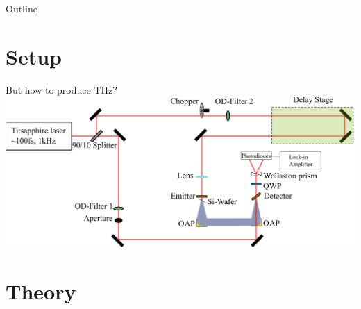 \documentclass[aspectratio=1610, 9pt]{beamer}
\begin{document}
\begin{frame}{Outline}
  \tableofcontents
\end{frame}

\section{Setup}

\begin{frame}{But how to produce THz?}
  \includegraphics[width=\textwidth]{images/Aufbau.pdf}
\end{frame}

\section{Theory}
\end{document}
